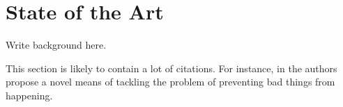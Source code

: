 \chapter{State of the Art} %
\label{chap:background}


Write background here.

This section is likely to contain a lot of citations.
%
For instance, in \cite{AnzengruberSocInfo2013} the authors propose a novel means of tackling the problem of preventing bad things from happening.